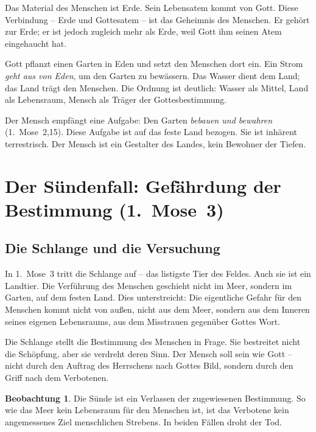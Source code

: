 ﻿\documentclass[a4paper,12pt]{article}
\theoremstyle{definition}
\newtheorem{observation}{Beobachtung}[section]
\begin{document}
Das Material des Menschen ist Erde. Sein Lebensatem kommt von Gott. Diese Verbindung
-- Erde und Gottesatem -- ist das Geheimnis des Menschen. Er gehört zur Erde; er
ist jedoch zugleich mehr als Erde, weil Gott ihm seinen Atem eingehaucht hat.

Gott pflanzt einen Garten in Eden und setzt den Menschen dort ein. Ein Strom
\textit{geht aus von Eden}, um den Garten zu bewässern. Das Wasser dient dem Land;
das Land trägt den Menschen. Die Ordnung ist deutlich: Wasser als Mittel, Land als
Lebensraum, Mensch als Träger der Gottesbestimmung.

Der Mensch empfängt eine Aufgabe: Den Garten \textit{bebauen und bewahren}
(1.~Mose~2,15). Diese Aufgabe ist auf das feste Land bezogen. Sie ist inhärent
terrestrisch. Der Mensch ist ein Gestalter des Landes, kein Bewohner der Tiefen.

\section{Der Sündenfall: Gefährdung der Bestimmung (1.~Mose~3)}

\subsection{Die Schlange und die Versuchung}

In 1.~Mose~3 tritt die Schlange auf -- das listigste Tier des Feldes. Auch sie
ist ein Landtier. Die Verführung des Menschen geschieht nicht im Meer, sondern
im Garten, auf dem festen Land. Dies unterstreicht: Die eigentliche Gefahr für
den Menschen kommt nicht von außen, nicht aus dem Meer, sondern aus dem Inneren
seines eigenen Lebensraums, aus dem Misstrauen gegenüber Gottes Wort.

Die Schlange stellt die Bestimmung des Menschen in Frage. Sie bestreitet nicht
die Schöpfung, aber sie verdreht deren Sinn. Der Mensch soll sein wie Gott --
nicht durch den Auftrag des Herrschens nach Gottes Bild, sondern durch den
Griff nach dem Verbotenen.

\begin{observation}
    Die Sünde ist ein Verlassen der zugewiesenen Bestimmung. So wie das Meer kein
    Lebensraum für den Menschen ist, ist das Verbotene kein angemessenes Ziel
    menschlichen Strebens. In beiden Fällen droht der Tod.
\end{observation}
\end{document}
